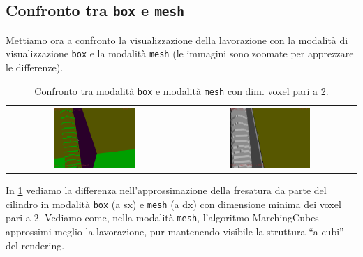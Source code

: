 \subsection{Confronto tra \texttt{box} e \texttt{mesh}}
Mettiamo ora a confronto la visualizzazione della lavorazione con la modalità di visualizzazione \texttt{box} e la modalità \texttt{mesh} (le immagini sono zoomate per apprezzare le differenze).
\begin{center}
\begin{table}[h]
  \begin{tabular}{cc}
   \includegraphics[width=0.48\textwidth]{img/screenshots/pos2_box_v2_2.png} &%
   \includegraphics[width=0.48\textwidth]{img/screenshots/pos2_mesh_v2_2.png}\\
  \end{tabular}
  \caption{Confronto tra modalità \texttt{box} e modalità \texttt{mesh} con dim. voxel pari a $2$.}
  \label{tab:confrontobm1}
\end{table}
\end{center}

In \ref{tab:confrontobm1} vediamo la differenza nell'approssimazione della fresatura da parte del cilindro in modalità \texttt{box} (a sx) e \texttt{mesh} (a dx) con dimensione minima dei voxel pari a $2$. Vediamo come, nella modalità \texttt{mesh}, l'algoritmo MarchingCubes approssimi meglio la lavorazione, pur mantenendo visibile la struttura ``a cubi'' del rendering.

